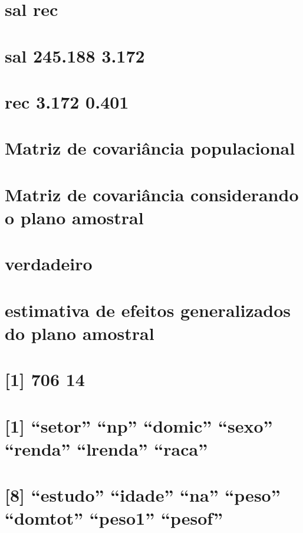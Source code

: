 \documentclass[]{book}
\theoremstyle{definition}
\theoremstyle{definition}
\theoremstyle{definition}
\theoremstyle{remark}
\begin{document}
\section{sal rec}\label{sal-rec-5}

\section{sal 245.188 3.172}\label{sal-245.188-3.172-1}

\section{rec 3.172 0.401}\label{rec-3.172-0.401-1}

\section{Matriz de covariância
populacional}\label{matriz-de-covariancia-populacional}

\section{Matriz de covariância considerando o plano
amostral}\label{matriz-de-covariancia-considerando-o-plano-amostral}

\section{verdadeiro}\label{verdadeiro}

\section{estimativa de efeitos generalizados do plano
amostral}\label{estimativa-de-efeitos-generalizados-do-plano-amostral}

\section{{[}1{]} 706 14}\label{section-31}

\section{\texorpdfstring{{[}1{]} ``setor'' ``np'' ``domic'' ``sexo''
``renda'' ``lrenda''
``raca''}{{[}1{]} setor np domic sexo renda lrenda raca}}\label{setor-np-domic-sexo-renda-lrenda-raca}

\section{\texorpdfstring{{[}8{]} ``estudo'' ``idade'' ``na'' ``peso''
``domtot'' ``peso1''
``pesof''}{{[}8{]} estudo idade na peso domtot peso1 pesof}}\label{estudo-idade-na-peso-domtot-peso1-pesof}
\end{document}
